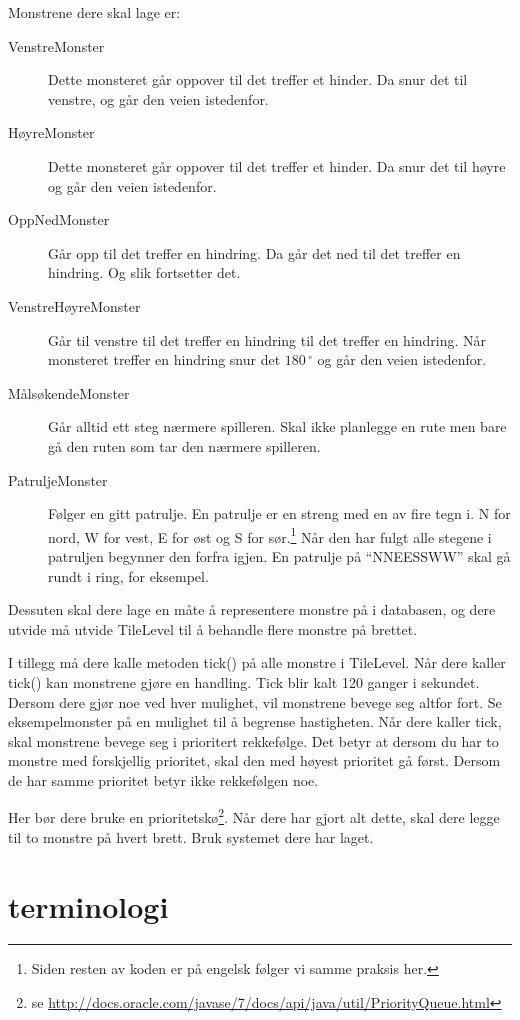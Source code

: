 \documentclass[norsk]{article}
\begin{document}
Monstrene dere skal lage er:
\begin{description}
\item [VenstreMonster] Dette monsteret går oppover til det treffer et hinder. Da snur det til venstre, og går den veien istedenfor.
\item [HøyreMonster] Dette monsteret går oppover til det treffer et hinder. Da snur det til høyre og går den veien istedenfor.
\item [OppNedMonster] Går opp til det treffer en hindring. Da går det ned til det treffer en hindring. Og slik fortsetter det.
\item [VenstreHøyreMonster] Går til venstre til det treffer en hindring til det treffer en hindring. Når monsteret treffer en hindring snur det $180\,^{\circ}$ og går den veien istedenfor.
\item [MålsøkendeMonster] Går alltid ett steg nærmere spilleren. Skal ikke planlegge en rute men bare gå den ruten som tar den nærmere spilleren.
\item [PatruljeMonster] Følger en gitt patrulje. En patrulje er en streng med en av fire tegn i. N for nord, W for vest, E for øst og S for sør.\footnote{Siden resten av koden er på engelsk følger vi samme praksis her.} Når den har fulgt alle stegene i patruljen begynner den forfra igjen. En patrulje på ``NNEESSWW'' skal gå rundt i ring, for eksempel.
\end{description}

Dessuten skal dere lage en måte å representere monstre på i databasen, og dere utvide må utvide TileLevel til å behandle flere monstre på brettet.

I tillegg må dere kalle metoden tick() på alle monstre i TileLevel.
Når dere kaller tick() kan monstrene gjøre en handling.
Tick blir kalt 120 ganger i sekundet.
Dersom dere gjør noe ved hver mulighet, vil monstrene bevege seg altfor fort.
Se eksempelmonster på en mulighet til å begrense hastigheten.
Når dere kaller tick, skal monstrene bevege seg i prioritert rekkefølge.
Det betyr at dersom du har to monstre med forskjellig prioritet, skal den med høyest prioritet gå først.
Dersom de har samme prioritet betyr ikke rekkefølgen noe.

Her bør dere bruke en prioritetskø\footnote{se \url{http://docs.oracle.com/javase/7/docs/api/java/util/PriorityQueue.html}}.
Når dere har gjort alt dette, skal dere legge til to monstre på hvert brett. Bruk systemet dere har laget.
\section{terminologi}
\end{document}
